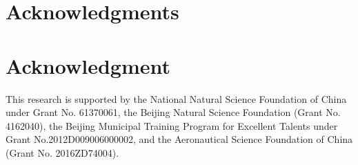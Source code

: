 \documentclass[10pt,journal,compsoc]{IEEEtran}
\begin{document}
\ifCLASSOPTIONcompsoc
  \section*{Acknowledgments}
\else
  \section*{Acknowledgment}
\fi


This research is supported by the National Natural Science Foundation of China under Grant No. 61370061, the Beijing Natural Science Foundation (Grant No. 4162040), the Beijing Municipal Training Program for Excellent Talents under Grant No.2012D009006000002, and the Aeronautical Science Foundation of China (Grant No. 2016ZD74004).





%




\ifCLASSOPTIONcaptionsoff
  \newpage
\fi


\end{document}
